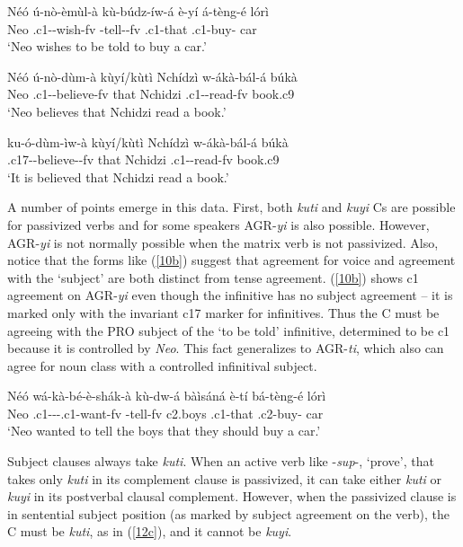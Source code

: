 \documentclass[output=paper,
modfonts
]{langscibook}
\begin{document}
\ex \label{10b} \gll Néó  ú-nò-èmùl-à kù-búdz-íw-á è-yí	 á-tèng-é lórì\\
	Neo	.c1--wish-fv	-tell--fv  .c1-that .c1-buy-	car\\
	\glt `Neo wishes to be told to buy a car.'

\ex \label{10c} \gll Néó ú-nò-dùm-à kùyí/kùtì Nchídzì  w-ákà-bál-á búkà\\
	Neo	 .c1--believe-fv that Nchidzi   .c1--read-fv book.c9\\
	\glt `Neo believes that Nchidzi read a book.'

\ex \label{10d} \gll ku-ó-dùm-ìw-à kùyí/kùtì  Nchídzì	w-ákà-bál-á búkà\\
	.c17--believe--fv that Nchidzi	.c1--read-fv book.c9\\
	\glt `It is believed that Nchidzi read a book.'\footnotemark
    \z\z
{} 

A number of points emerge in this data. First, both \textit{kuti} and \textit{kuyi} Cs are possible for passivized verbs and for some speakers AGR-\textit{yi} is also possible. However, AGR-\textit{yi} is not normally possible when the matrix verb is not passivized. Also, notice that the forms like (\ref{10b}) suggest that agreement for voice and agreement with the `subject' are both distinct from tense agreement. (\ref{10b}) shows c1 agreement on AGR-\textit{yi} even though the infinitive has no subject agreement – it is marked only with the invariant c17 marker for infinitives. Thus the C must be agreeing with the PRO subject of the `to be told' infinitive, determined to be c1 because it is controlled by \textit{Neo}. This fact generalizes to AGR-\textit{ti}, which also can agree for noun class with a controlled infinitival subject. 

\ea \label{11} \gll	Néó	wá-kà-bé-è-shák-à kù-dw-á bàìsáná  è-tí bá-tèng-é 		lórì\\
	Neo	.c1---.c1-want-fv -tell-fv c2.boys .c1-that
    .c2-buy-	car\\
    \glt `Neo wanted to tell the boys that they should buy a car.'\z

Subject clauses always take \textit{kuti}. When an active verb like -\textit{sup}-, `prove',  that takes only \textit{kuti} in its complement clause is passivized, it can take either \textit{kuti} or \textit{kuyi} in its postverbal clausal complement. However, when the passivized clause is in sentential subject position (as marked by subject agreement on the verb), the C must be \textit{kuti}, as in (\ref{12c}), and it cannot be \textit{kuyi}.
\end{document}
